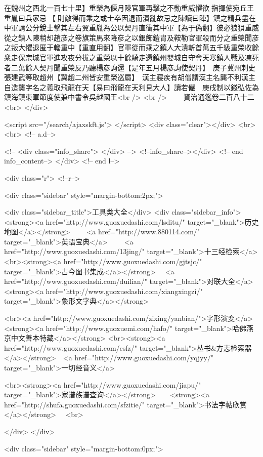 在魏州之西北一百七十里】重榮為偃月陳官軍再擊之不動重威懼欲指揮使宛丘王重胤曰兵家忌【則敵得而乘之或士卒因退而潰亂故忌之陳讀曰陣】鎮之精兵盡在中軍請公分銳士撃其左右翼重胤為公以契丹直衝其中軍【為于偽翻】彼必狼狽重威從之鎮人陳稍却趙彦之卷旗策馬來降彦之以銀飾鎧胄及鞍勒官軍殺而分之重榮聞彦之叛大懼退匿于輜重中【重直用翻】官軍從而乘之鎮人大潰斬首萬五千級重榮收餘衆走保宗城官軍進攻夜分拔之重榮以十餘騎走還鎮州嬰城自守會天寒鎮人戰及凍死者二萬餘人契丹聞重榮反乃聽楊彦詢還【是年五月楊彦詢使契丹】　庚子冀州刺史張建武等取趙州【冀趙二州皆安重榮巡屬】　漢主寢疾有胡僧謂漢主名龔不利漢主自造龑字名之義取飛龍在天【易曰飛龍在天利見大人】讀若儼　庚戌制以錢弘佐為鎮海鎮東軍節度使兼中書令吳越國王<br />
<br />
　　資治通鑑卷二百八十二  <br>
   </div> 

<script src="/search/ajaxskft.js"> </script>
 <div class="clear"></div>
<br>
<br>
 <!-- a.d-->

 <!--
<div class="info_share">
</div> 
-->
 <!--info_share--></div>   <!-- end info_content-->
  </div> <!-- end l-->

<div class="r">   <!--r-->



<div class="sidebar"  style="margin-bottom:2px;">

 
<div class="sidebar_title">工具类大全</div>
<div class="sidebar_info">
<strong><a href="http://www.guoxuedashi.com/lsditu/" target="_blank">历史地图</a></strong>　　
<a href="http://www.880114.com/" target="_blank">英语宝典</a>　　
<a href="http://www.guoxuedashi.com/13jing/" target="_blank">十三经检索</a>　
<br><strong><a href="http://www.guoxuedashi.com/gjtsjc/" target="_blank">古今图书集成</a></strong>　
<a href="http://www.guoxuedashi.com/duilian/" target="_blank">对联大全</a>　<strong><a href="http://www.guoxuedashi.com/xiangxingzi/" target="_blank">象形文字典</a></strong>　

<br><a href="http://www.guoxuedashi.com/zixing/yanbian/">字形演变</a>　　<strong><a href="http://www.guoxuemi.com/hafo/" target="_blank">哈佛燕京中文善本特藏</a></strong>
<br><strong><a href="http://www.guoxuedashi.com/csfz/" target="_blank">丛书&方志检索器</a></strong>　<a href="http://www.guoxuedashi.com/yqjyy/" target="_blank">一切经音义</a>　　

<br><strong><a href="http://www.guoxuedashi.com/jiapu/" target="_blank">家谱族谱查询</a></strong>　　<strong><a href="http://shufa.guoxuedashi.com/sfzitie/" target="_blank">书法字帖欣赏</a></strong>　
<br>

</div>
</div>


<div class="sidebar" style="margin-bottom:0px;">

